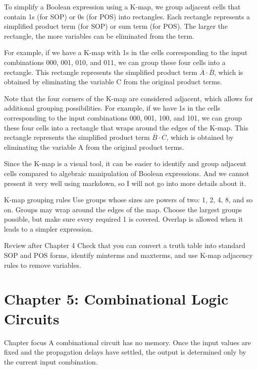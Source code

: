 \documentclass[11pt,a4paper]{article}
\begin{document}
To simplify a Boolean expression using a K-map, we group adjacent cells
that contain 1s (for SOP) or 0s (for POS) into rectangles. Each
rectangle represents a simplified product term (for SOP) or sum term
(for POS). The larger the rectangle, the more variables can be
eliminated from the term.

For example, if we have a K-map with 1s in the cells corresponding to
the input combinations 000, 001, 010, and 011, we can group these four
cells into a rectangle. This rectangle represents the simplified product
term \(\overline{A} \cdot \overline{B}\), which is obtained by
eliminating the variable C from the original product terms.

Note that the four corners of the K-map are considered adjacent, which
allows for additional grouping possibilities. For example, if we have 1s
in the cells corresponding to the input combinations 000, 001, 100, and
101, we can group these four cells into a rectangle that wraps around
the edges of the K-map. This rectangle represents the simplified product
term \(\overline{B} \cdot \overline{C}\), which is obtained by
eliminating the variable A from the original product terms.

Since the K-map is a visual tool, it can be easier to identify and group
adjacent cells compared to algebraic manipulation of Boolean
expressions. And we cannot present it very well using markdown, so I
will not go into more details about it.

\begin{notebox}{K-map grouping rules}
Use groups whose sizes are powers of two: 1, 2, 4, 8, and so on. Groups may wrap around the edges of the map. Choose the largest groups possible, but make sure every required 1 is covered. Overlap is allowed when it leads to a simpler expression.
\end{notebox}

\begin{notebox}{Review after Chapter 4}
Check that you can convert a truth table into standard SOP and POS forms, identify minterms and maxterms, and use K-map adjacency rules to remove variables.
\end{notebox}

\section{Chapter 5: Combinational Logic
Circuits}\label{chapter-5-combinational-logic-circuits}

\begin{chapterbox}{Chapter focus}
A combinational circuit has no memory. Once the input values are fixed and the propagation delays have settled, the output is determined only by the current input combination.
\end{chapterbox}
\end{document}
